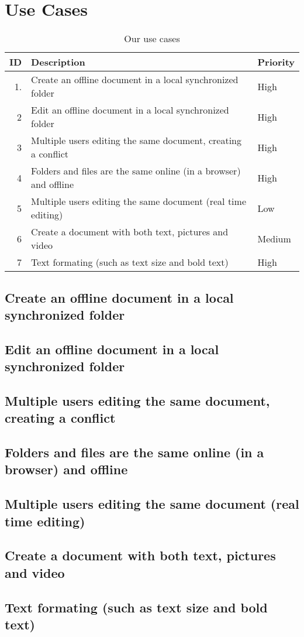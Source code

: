\section{Use Cases}
\begin{table*}[ht]\centering
  \begin{tabularx}{\textwidth}{@{}rXl@{}}\toprule
    \textbf{ID} & \textbf{Description} & \textbf{Priority} \\\hline
    1.
    & Create an offline document in a local synchronized folder
    & High \\\hline
    2 
    & Edit an offline document in a local synchronized folder
    & High \\\hline
    3 
    & Multiple users editing the same document, creating a conflict
    & High \\\hline
    4 
    & Folders and files are the same online (in a browser) and offline
    & High \\\hline
    5 
    & Multiple users editing the same document (real time editing)
    & Low \\\hline
    6 
    & Create a document with both text, pictures and video
	& Medium \\\hline
    7 
    & Text formating (such as text size and bold text)
    & High \\
    \bottomrule
  \end{tabularx}
  \caption{Our use cases}
  \label{usecases}\centering%
\end{table*}

\subsection{Create an offline document in a local synchronized folder}
\subsection{Edit an offline document in a local synchronized folder}
\subsection{Multiple users editing the same document, creating a conflict}
\subsection{Folders and files are the same online (in a browser) and offline}
\subsection{Multiple users editing the same document (real time editing)}
\subsection{Create a document with both text, pictures and video}
\subsection{Text formating (such as text size and bold text)}

\newpage